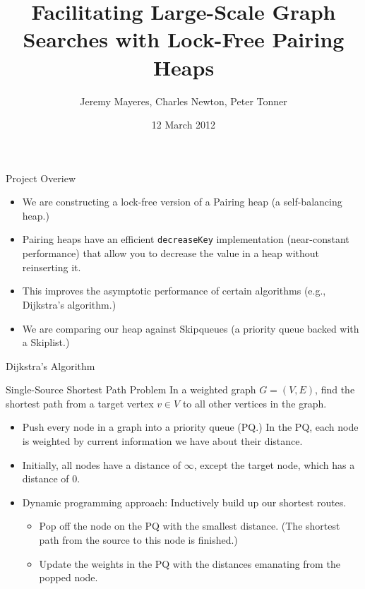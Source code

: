 \documentclass{beamer}
\date{12 March 2012}
\author{Jeremy Mayeres, Charles Newton, Peter Tonner}
\title{Facilitating Large-Scale Graph Searches with Lock-Free Pairing Heaps}
\begin{document}
\maketitle

\begin{frame}{Project Overiew}
  \begin{itemize}
    \item We are constructing a lock-free version of a Pairing heap (a self-balancing heap.)
    \item Pairing heaps have an efficient \texttt{decreaseKey} implementation
      (near-constant performance) that allow you to decrease the value in a heap without
      reinserting it.
    \item This improves the asymptotic performance of certain algorithms (e.g., Dijkstra's algorithm.)
    \item We are comparing our heap against Skipqueues (a priority queue backed with a Skiplist.)
  \end{itemize}
\end{frame}

\begin{frame}{Dijkstra's Algorithm}
  \begin{block}{Single-Source Shortest Path Problem}
    In a weighted graph $G=(V,E)$, find the shortest path from a target
    vertex $v \in V$ to all other vertices in the graph.
  \end{block}
  \begin{itemize}
    \item Push every node in a graph into a priority queue (PQ.) In the PQ, 
      each node is weighted by current information we have about their distance.
    \item Initially, all nodes have a distance of $\infty$, except the target
      node, which has a distance of $0$.
    \item Dynamic programming approach: Inductively build up our shortest routes.
      \begin{itemize}
        \item Pop off the node on the PQ with the smallest distance. (The shortest path from the source to this
          node is finished.)
        \item Update the weights in the PQ with the distances emanating from the popped node.
      \end{itemize}
    \end{itemize}
\end{frame}
\end{document}

